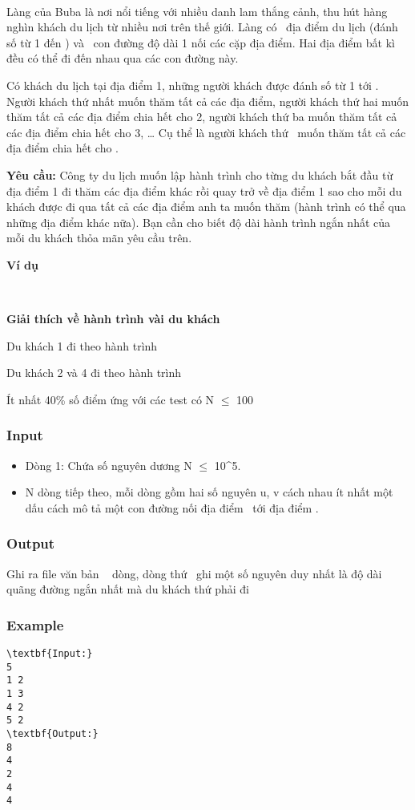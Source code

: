 

 

Làng của Buba là nơi nổi tiếng với nhiều danh lam thắng cảnh, thu hút hàng nghìn khách du lịch từ nhiều nơi trên thế giới. Làng có  địa điểm du lịch (đánh số từ 1 đến ) và  con đường độ dài 1 nối các cặp địa điểm. Hai địa điểm bất kì đều có thể đi đến nhau qua các con đường này.

Có khách du lịch tại địa điểm 1, những người khách được đánh số từ 1 tới . Người khách thứ nhất muốn thăm tất cả các địa điểm, người khách thứ hai muốn thăm tất cả các địa điểm chia hết cho 2, người khách thứ ba muốn thăm tất cả các địa điểm chia hết cho 3, … Cụ thể là người khách thứ  muốn thăm tất cả các địa điểm chia hết cho .

\textbf{Yêu cầu: } Công ty du lịch muốn lập hành trình cho từng du khách bắt đầu từ địa điểm 1 đi thăm các địa điểm khác rồi quay trở về địa điểm 1 sao cho mỗi du khách được đi qua tất cả các địa điểm anh ta muốn thăm (hành trình có thể qua những địa điểm khác nữa). Bạn cần cho biết độ dài hành trình ngắn nhất của mỗi du khách thỏa mãn yêu cầu trên.

\textbf{Ví dụ }

 

\textbf{Giải thích về hành trình vài du khách }

Du khách 1 đi theo hành trình \textbf{}

Du khách 2 và 4 đi theo hành trình

Ít nhất 40\% số điểm ứng với các test có N  $\le$  100

\subsubsection{Input}
\begin{itemize}
	\item Dòng 1: Chứa số nguyên dương N  $\le$  10\textasciicircum5.
	\item N dòng tiếp theo, mỗi dòng gồm hai số nguyên u, v cách nhau ít nhất một dấu cách mô tả một con đường nối địa điểm  tới địa điểm .
\end{itemize}

\subsubsection{Output}

Ghi ra file văn bản   dòng, dòng thứ  ghi một số nguyên duy nhất là độ dài quãng đường ngắn nhất mà du khách thứ phải đi

\subsubsection{Example}
\begin{verbatim}
\textbf{Input:}
5
1 2
1 3
4 2
5 2
\textbf{Output:}
8
4
2
4
4\end{verbatim}
